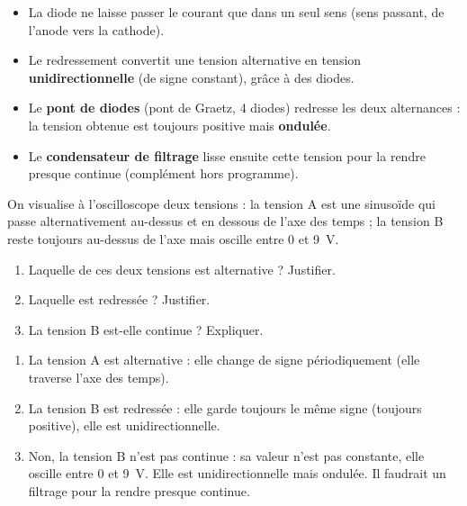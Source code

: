 \documentclass[11pt]{article}
\newcommand{\cle}[1]{{\popxbold\color{popdark}#1}}
\begin{document}
\begin{aretenir}
\begin{itemize}
\item La \cle{diode} ne laisse passer le courant que dans un seul sens (sens passant, de l'anode vers la cathode).
\item Le \cle{redressement} convertit une tension alternative en tension \textbf{unidirectionnelle} (de signe constant), grâce à des diodes.
\item Le \textbf{pont de diodes} (pont de Graetz, 4 diodes) redresse les deux alternances : la tension obtenue est toujours positive mais \textbf{ondulée}.
\item Le \textbf{condensateur de filtrage} lisse ensuite cette tension pour la rendre presque continue (complément hors programme).
\end{itemize}
\end{aretenir}

\begin{exercice}
On visualise à l'oscilloscope deux tensions : la tension A est une sinusoïde qui passe alternativement au-dessus et en dessous de l'axe des temps ; la tension B reste toujours au-dessus de l'axe mais oscille entre 0 et \SI{9}{V}.
\begin{enumerate}
\item Laquelle de ces deux tensions est alternative ? Justifier.
\item Laquelle est redressée ? Justifier.
\item La tension B est-elle continue ? Expliquer.
\end{enumerate}
\end{exercice}

\begin{corrige}[Exercice]
\begin{enumerate}
\item La tension A est alternative : elle change de signe périodiquement (elle traverse l'axe des temps).
\item La tension B est redressée : elle garde toujours le même signe (toujours positive), elle est unidirectionnelle.
\item Non, la tension B n'est pas continue : sa valeur n'est pas constante, elle oscille entre 0 et \SI{9}{V}. Elle est unidirectionnelle mais ondulée. Il faudrait un filtrage pour la rendre presque continue.
\end{enumerate}
\end{corrige}
\end{document}
